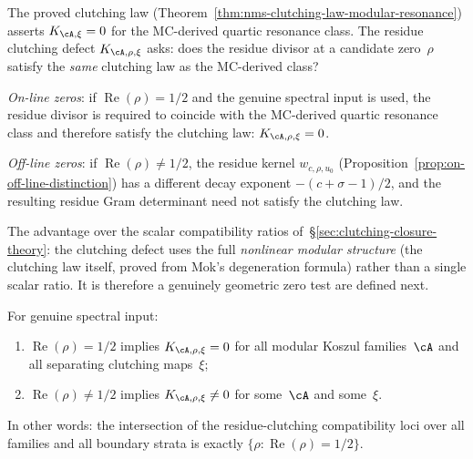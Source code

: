 \begin{remark}%
\label{rem:clutching-defect-meaning}%
%
The proved clutching law
(Theorem~\ref{thm:nms-clutching-law-modular-resonance})
asserts $K_{\cA,\xi} = 0$ for the MC-derived quartic
resonance class.
The residue clutching defect $K_{\cA,\rho,\xi}$ asks:
does the residue divisor at a candidate zero~$\rho$
satisfy the \emph{same} clutching law as the MC-derived
class?

\medskip\noindent
\emph{On-line zeros}: if $\operatorname{Re}(\rho) = 1/2$
and the genuine spectral input is used, the residue divisor is required
to coincide with the MC-derived quartic resonance class
and therefore satisfy the clutching law: $K_{\cA,\rho,\xi} = 0$.

\medskip\noindent
\emph{Off-line zeros}: if $\operatorname{Re}(\rho) \neq 1/2$,
the residue kernel $w_{c,\rho,u_0}$
(Proposition~\ref{prop:on-off-line-distinction}) has a
different decay exponent $-(c{+}\sigma{-}1)/2$, and the
resulting residue Gram determinant need not satisfy the
clutching law.

\medskip\noindent
The advantage over the scalar compatibility
ratios of~\S\ref{sec:clutching-closure-theory}: the clutching defect
uses the full \emph{nonlinear modular structure} (the clutching
law itself, proved from Mok's degeneration formula) rather than
a single scalar ratio. It is therefore a genuinely geometric
zero test are defined next.
\end{remark}

\begin{conjecture}%
\label{conj:clutching-closure}%
\ClaimStatusConjectured%
%
For genuine spectral input\textup{:}
\begin{enumerate}[label=\textup{(\roman*)}]
\item
$\operatorname{Re}(\rho) = 1/2$ implies
$K_{\cA,\rho,\xi} = 0$ for all modular Koszul
families~$\cA$ and all separating clutching maps~$\xi$\textup;
\item
$\operatorname{Re}(\rho) \neq 1/2$ implies
$K_{\cA,\rho,\xi} \neq 0$ for some~$\cA$ and
some~$\xi$.
\end{enumerate}
In other words: the intersection of the residue-clutching
compatibility loci over all families and all boundary strata is
exactly $\{\rho : \operatorname{Re}(\rho) = 1/2\}$.
\end{conjecture}

